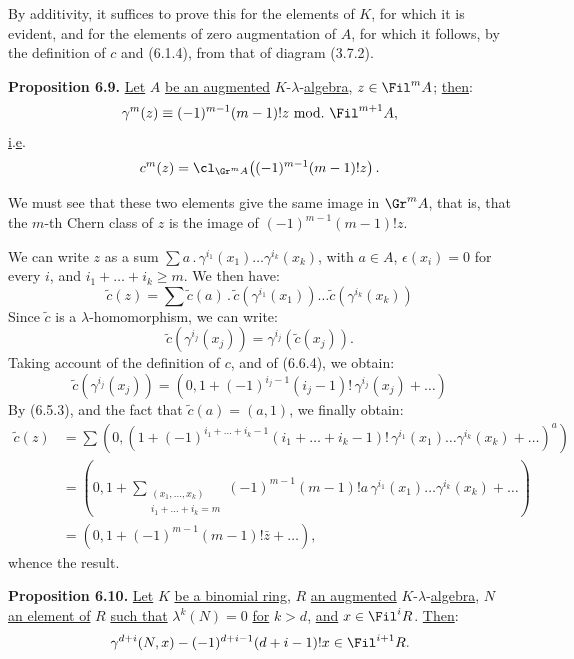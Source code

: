 By additivity, it suffices to prove this for the elements of \(K\), for which it is evident, and for the elements of zero augmentation of \(A\), for which it follows, by the definition of \(c\) and (6.1.4), from that of diagram (3.7.2).

\textbf{Proposition 6.9.} \uline{Let} \(A\) \uline{be an augmented} \(K\)-\(\lambda\)-\uline{algebra}, \(z\in\Fil^mA\); \uline{then}:
\[
  \gamma^m(z)\equiv(-1)^{m-1}(m-1)!z\ \mathrm{mod.}\ \Fil^{m+1}A,
\]
\uline{i}.\uline{e}.
\[
  c^m(z)=\cl_{\Gr^mA}\!\left((-1)^{m-1}(m-1)!z\right).
\]

We must see that these two elements give the same image in \(\Gr^mA\), that is, that the \(m\)-th Chern class of \(z\) is the image of \((-1)^{m-1}(m-1)!z\).

We can write \(z\) as a sum \(\sum a\mathbin{.}\gamma^{i_1}(x_1)\ldots\gamma^{i_k}(x_k)\), with \(a\in A\), \(\epsilon(x_i)=0\) for every \(i\), and \(i_1+\ldots+i_k\ge m\). We then have:
\[
  \widetilde c(z)=
  \sum \widetilde c(a)\mathbin{.}
        \widetilde c(\gamma^{i_1}(x_1))\ldots
        \widetilde c(\gamma^{i_k}(x_k))
\]
Since \(\widetilde c\) is a \(\lambda\)-homomorphism, we can write:
\[
  \widetilde c(\gamma^{i_j}(x_j))=\gamma^{i_j}(\widetilde c(x_j)).
\]
%
Taking account of the definition of \(c\), and of (6.6.4), we obtain:
\[
  \widetilde c(\gamma^{i_j}(x_j))
  =
  \left(0,1+(-1)^{i_j-1}(i_j-1)!\,\gamma^{i_j}(x_j)+\ldots\right)
\]
By (6.5.3), and the fact that \(\widetilde c(a)=(a,1)\), we finally obtain:
\[
\begin{aligned}
\widetilde c(z)
&=\sum
\left(0,\left(1+
(-1)^{i_1+\ldots+i_k-1}
(i_1+\ldots+i_k-1)!
\,\gamma^{i_1}(x_1)\ldots\gamma^{i_k}(x_k)
+\ldots\right)^a\right)\\
&=
\left(0,1+
\sum_{\substack{(x_1,\ldots,x_k)\\ i_1+\ldots+i_k=m}}
(-1)^{m-1}(m-1)!a\,\gamma^{i_1}(x_1)\ldots\gamma^{i_k}(x_k)
+\ldots\right)\\
&=
(0,1+(-1)^{m-1}(m-1)!\bar z+\ldots),
\end{aligned}
\]
whence the result.

\textbf{Proposition 6.10.} \uline{Let} \(K\) \uline{be a binomial ring}, \(R\) \uline{an augmented} \(K\)-\(\lambda\)-\uline{algebra}, \(N\) \uline{an element of} \(R\) \uline{such that} \(\lambda^k(N)=0\) \uline{for} \(k>d\), \uline{and} \(x\in\Fil^iR\). \uline{Then}:
\[
  \gamma^{d+i}(N,x)-(-1)^{d+i-1}(d+i-1)!x\in\Fil^{i+1}R.
\]

